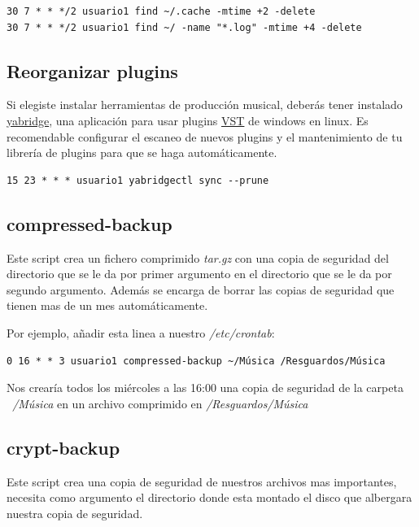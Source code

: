 \documentclass[12pt]{article}
\begin{document}
\begin{verbatim}
30 7 * * */2 usuario1 find ~/.cache -mtime +2 -delete
30 7 * * */2 usuario1 find ~/ -name "*.log" -mtime +4 -delete
\end{verbatim}

\subsection{Reorganizar plugins}

Si elegiste instalar herramientas de producción musical, deberás tener instalado \href{https://github.com/robbert-vdh/yabridge}{yabridge}, una aplicación para usar plugins \href{https://es.wikipedia.org/wiki/Virtual_Studio_Technology}{VST} de windows en linux. Es recomendable configurar el escaneo de nuevos plugins y el mantenimiento de tu librería de plugins para que se haga automáticamente.

\begin{verbatim}
15 23 * * * usuario1 yabridgectl sync --prune
\end{verbatim}

\subsection{compressed-backup}

Este script crea un fichero comprimido \emph{tar.gz} con una copia de seguridad del directorio que se le da por primer argumento en el directorio que se le da por segundo argumento. Además se encarga de borrar las copias de seguridad que tienen mas de un mes automáticamente.

Por ejemplo, añadir esta linea a nuestro \emph{/etc/crontab}:

\begin{verbatim}
0 16 * * 3 usuario1 compressed-backup ~/Música /Resguardos/Música
\end{verbatim}

Nos crearía todos los miércoles a las 16:00 una copia de seguridad de la carpeta \emph{~/Música} en un archivo comprimido en \emph{/Resguardos/Música}

\subsection{crypt-backup}

Este script crea una copia de seguridad de nuestros archivos mas importantes, necesita como argumento el directorio donde esta montado el disco que albergara nuestra copia de seguridad.
\end{document}

